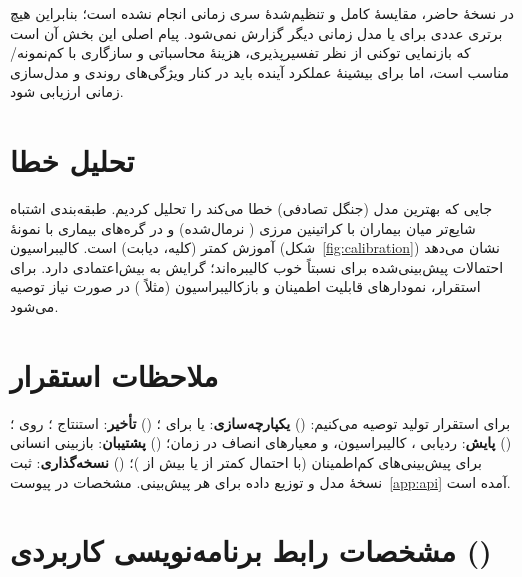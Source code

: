 در نسخۀ حاضر، مقایسۀ کامل و تنظیم‌شدۀ سری زمانی انجام نشده است؛ بنابراین هیچ برتری عددی برای  یا مدل زمانی دیگر گزارش نمی‌شود. پیام اصلی این بخش آن است که بازنمایی توکنی از نظر تفسیرپذیری، هزینۀ محاسباتی و سازگاری با کم‌نمونه/ مناسب است، اما برای بیشینۀ عملکرد آینده باید در کنار ویژگی‌های روندی و مدل‌سازی زمانی ارزیابی شود.

\section{تحلیل خطا}

جایی که بهترین مدل (جنگل تصادفی) خطا می‌کند را تحلیل کردیم. طبقه‌بندی اشتباه شایع‌تر میان بیماران با کراتینین مرزی ( نرمال‌شده) و در گره‌های بیماری با نمونۀ آموزش کمتر (کلیه، دیابت) است. کالیبراسیون (شکل~\ref{fig:calibration}) نشان می‌دهد احتمالات پیش‌بینی‌شده برای  نسبتاً خوب کالیبره‌اند؛  گرایش به بیش‌اعتمادی دارد. برای استقرار، نمودارهای قابلیت اطمینان و بازکالیبراسیون (مثلاً ) در صورت نیاز توصیه می‌شود.

\section{ملاحظات استقرار}

برای استقرار تولید توصیه می‌کنیم: () \textbf{یکپارچه‌سازی}:  یا  برای ؛ () \textbf{تأخیر}: استنتاج \mbox{}؛ \mbox{} روی ؛ () \textbf{پایش}: ردیابی ، کالیبراسیون، و معیارهای انصاف در زمان؛ () \textbf{پشتیبان}: بازبینی انسانی برای پیش‌بینی‌های کم‌اطمینان (با احتمال کمتر از  یا بیش از )؛ () \textbf{نسخه‌گذاری}: ثبت نسخۀ مدل و توزیع داده برای هر پیش‌بینی. مشخصات  در پیوست~\ref{app:api} آمده است.

\section{\texorpdfstring{مشخصات رابط برنامه‌نویسی کاربردی ()}{مشخصات رابط برنامه‌نویسی کاربردی (API)}}

